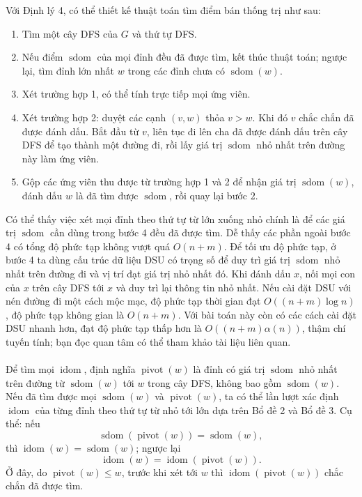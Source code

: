 \documentclass[11pt]{article}
\begin{document}
Với Định lý 4, có thể thiết kế thuật toán tìm điểm bán thống trị như sau:

\begin{enumerate}
  \item Tìm một cây DFS của \(G\) và thứ tự DFS.
  \item Nếu điểm \(\operatorname{sdom}\) của mọi đỉnh đều đã được tìm, kết thúc
  thuật toán; ngược lại, tìm đỉnh lớn nhất \(w\) trong các đỉnh chưa có
  \(\operatorname{sdom}(w)\).
  \item Xét trường hợp 1, có thể tính trực tiếp mọi ứng viên.
  \item Xét trường hợp 2: duyệt các cạnh \((v,w)\) thỏa \(v>w\). Khi đó \(v\)
  chắc chắn đã được đánh dấu. Bắt đầu từ \(v\), liên tục đi lên cha đã được
  đánh dấu trên cây DFS để tạo thành một đường đi, rồi lấy giá trị
  \(\operatorname{sdom}\) nhỏ nhất trên đường này làm ứng viên.
  \item Gộp các ứng viên thu được từ trường hợp 1 và 2 để nhận giá trị
  \(\operatorname{sdom}(w)\), đánh dấu \(w\) là đã tìm được
  \(\operatorname{sdom}\), rồi quay lại bước 2.
\end{enumerate}

Có thể thấy việc xét mọi đỉnh theo thứ tự từ lớn xuống nhỏ chính là để các giá
trị \(\operatorname{sdom}\) cần dùng trong bước 4 đều đã được tìm. Dễ thấy các
phần ngoài bước 4 có tổng độ phức tạp không vượt quá \(O(n+m)\). Để tối ưu độ
phức tạp, ở bước 4 ta dùng cấu trúc dữ liệu DSU có trọng số để duy trì giá trị
\(\operatorname{sdom}\) nhỏ nhất trên đường đi và vị trí đạt giá trị nhỏ nhất
đó. Khi đánh dấu \(x\), nối mọi con của \(x\) trên cây DFS tới \(x\) và duy trì
lại thông tin nhỏ nhất. Nếu cài đặt DSU với nén đường đi một cách mộc mạc, độ
phức tạp thời gian đạt \(O((n+m)\log n)\), độ phức tạp không gian là \(O(n+m)\).
Với bài toán này còn có các cách cài đặt DSU nhanh hơn, đạt độ phức tạp thấp
hơn là \(O((n+m)\alpha(n))\), thậm chí tuyến tính; bạn đọc quan tâm có thể tham
khảo tài liệu liên quan.

\paragraph{}
Để tìm mọi \(\operatorname{idom}\), định nghĩa \(\operatorname{pivot}(w)\) là
đỉnh có giá trị \(\operatorname{sdom}\) nhỏ nhất trên đường từ
\(\operatorname{sdom}(w)\) tới \(w\) trong cây DFS, không bao gồm
\(\operatorname{sdom}(w)\). Nếu đã tìm được mọi \(\operatorname{sdom}(w)\) và
\(\operatorname{pivot}(w)\), ta có thể lần lượt xác định
\(\operatorname{idom}\) của từng đỉnh theo thứ tự từ nhỏ tới lớn dựa trên Bổ
đề 2 và Bổ đề 3. Cụ thể: nếu
\[
\operatorname{sdom}(\operatorname{pivot}(w))=\operatorname{sdom}(w),
\]
thì \(\operatorname{idom}(w)=\operatorname{sdom}(w)\); ngược lại
\[
\operatorname{idom}(w)=\operatorname{idom}(\operatorname{pivot}(w)).
\]
Ở đây, do \(\operatorname{pivot}(w)\le w\), trước khi xét tới \(w\) thì
\(\operatorname{idom}(\operatorname{pivot}(w))\) chắc chắn đã được tìm.
\end{document}
